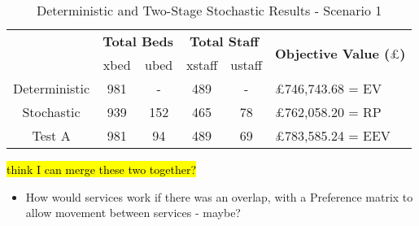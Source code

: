 \documentclass[../thesis.tex]{subfiles}
\begin{document}
\begin{table}[h!]
    \centering
    \begin{tabular}{cccccl}\toprule
 & \multicolumn{2}{l}{\textbf{Total Beds}} & \multicolumn{2}{c}{\textbf{Total Staff}} & \multirow{2}{*}{\textbf{Objective Value ($\pounds$)}}\\ \cmidrule(lr){2-3} \cmidrule(lr){4-5}
         
 & xbed           & ubed          & xstaff         & ustaff         \\ \midrule
 Deterministic & 981 & - & 489 & - & $\pounds$746,743.68 = EV \\
 Stochastic & 939 & 152 & 465 & 78 & $\pounds$762,058.20 = RP \\
 Test A & 981 & 94 & 489 & 69 & $\pounds$783,585.24 = EEV \\\bottomrule
    \end{tabular}
    \caption{Deterministic and Two-Stage Stochastic Results - Scenario 1}
    \label{tab:Scenario1Results}
\end{table}







\hl{think I can merge these two together?}
\begin{itemize}
    \item How would services work if there was an overlap, with a Preference matrix to allow movement between services - maybe? 
\end{itemize}
\end{document}
